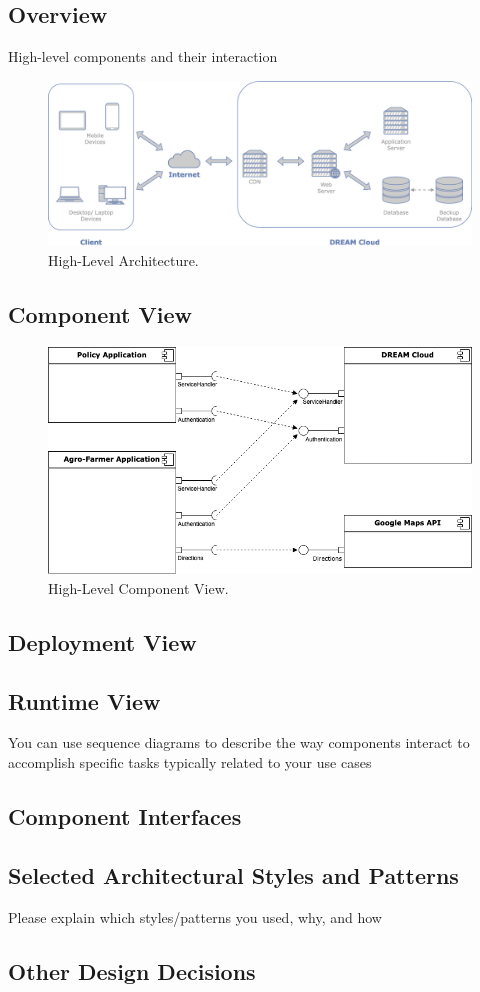 \subsection{Overview}
 High-level components and their interaction
 
\begin{figure}[hbt!]
\centering
\includegraphics[scale=0.2]{../images_diagrams/dd/highlevel_arch.png}
\caption{High-Level Architecture.}
\label{fig:highLevelArch}
\end{figure}




\subsection{Component View}

\begin{figure}[hbt!]
\centering
\includegraphics[scale=0.6]{../images_diagrams/dd/high_level_cloud.png}
\caption{High-Level Component View.}
\label{fig:highLevelComp}
\end{figure}

\subsection{Deployment View}
\subsection{Runtime View}
You can use sequence diagrams to describe the way components interact
to accomplish specific tasks typically related to your use cases
\subsection{Component Interfaces}
\subsection{Selected Architectural Styles and Patterns}
Please explain which styles/patterns you used, why, and how
\subsection{Other Design Decisions}